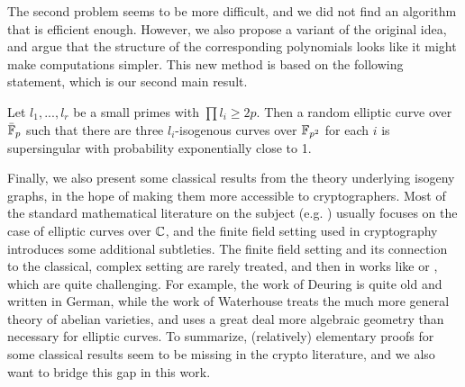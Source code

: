 The second problem seems to be more difficult, and we did not find an algorithm that is efficient enough.
However, we also propose a variant of the original idea, and argue that the structure of the corresponding polynomials looks like it might make computations simpler.
This new method is based on the following statement, which is our second main result.
\begin{prop}
    \label{prop:main_result2}
    Let $l_1, ..., l_r$ be a small primes with $\prod l_i \geq 2p$.
    Then a random elliptic curve over $\bar{\mathbb{F}}_p$ such that there are three $l_i$-isogenous curves over $\mathbb{F}_{p^2}$ for each $i$ is supersingular with probability exponentially close to 1.
\end{prop}
Finally, we also present some classical results from the theory underlying isogeny graphs, in the hope of making them more accessible to cryptographers.
Most of the standard mathematical literature on the subject (e.g. \cite{cox_primes_of_form}) usually focuses on the case of elliptic curves over $\mathbb{C}$, and the finite field setting used in cryptography introduces some additional subtleties.
The finite field setting and its connection to the classical, complex setting are rarely treated, and then in works like \cite{deuring_endomorphism_rings} or \cite{class_group_action_waterhouse}, which are quite challenging.
For example, the work of Deuring \cite{deuring_endomorphism_rings} is quite old and written in German, while the work of Waterhouse \cite{class_group_action_waterhouse} treats the much more general theory of abelian varieties, and uses a great deal more algebraic geometry than necessary for elliptic curves. 
To summarize, (relatively) elementary proofs for some classical results seem to be missing in the crypto literature, and we also want to bridge this gap in this work.